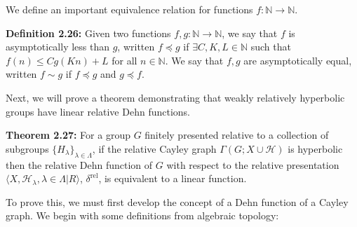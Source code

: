 \documentclass[12pt]{article}
\newcommand{\vs}{\vskip10pt}
\begin{document}
	\vs 
	
	We define an important equivalence relation for functions $f: \mathbb{N} \rightarrow \mathbb{N}$. 
	
	\vs 
	
	\textbf{Definition 2.26: } Given two functions $f,g: \mathbb{N} \rightarrow \mathbb{N}$, we say that $f$ is asymptotically less than $g$, written $f \preccurlyeq g$ if $\exists C,K,L \in \mathbb{N}$ such that $f(n) \leq Cg(Kn) + L$ for all $n \in \mathbb{N}$. We say that $f,g$ are asymptotically equal, written $f \sim g$ if $f \preccurlyeq g$ and $g \preccurlyeq f$.
	
	\vs 
	
	Next, we will prove a theorem demonstrating that weakly relatively hyperbolic groups have linear relative Dehn functions. 
	
	\vs 
	
	\textbf{Theorem 2.27: } For a group $G$ finitely presented relative to a collection of subgroups $\{H_{\lambda}\}_{\lambda \in \Lambda}$, if the relative Cayley graph $\Gamma(G; X \cup \mathcal{H})$ is hyperbolic then the relative Dehn function of $G$ with respect to the relative presentation $\langle X, \mathcal{H}_{\lambda}, \lambda \in \Lambda \vert R \rangle $, $\delta^{\text{rel}}$, is equivalent to a linear function. 
	
	\vs 
	
	To prove this, we must first develop the concept of a Dehn function of a Cayley graph. We begin with some definitions from algebraic topology: 
	
	\vs
	
\end{document}
